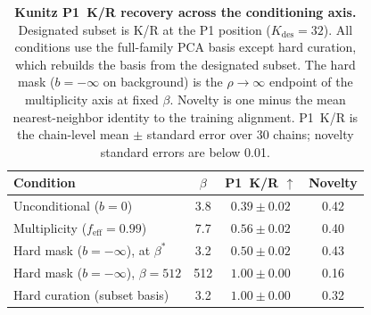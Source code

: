 \documentclass{article}
\theoremstyle{definition}
\theoremstyle{remark}
\begin{document}
\begin{table}[t]
  \centering
  \caption{\textbf{Kunitz P1~K/R recovery across the conditioning axis.} Designated
  subset is K/R at the P1 position ($K_{\mathrm{des}} = 32$). All conditions use the
  full-family PCA basis except hard curation, which rebuilds the basis from the
  designated subset. The hard mask ($b = -\infty$ on background) is the
  $\rho \to \infty$ endpoint of the multiplicity axis at fixed $\beta$. Novelty is one
  minus the mean nearest-neighbor identity to the training alignment. P1~K/R is the chain-level
  mean $\pm$ standard error over 30 chains; novelty standard errors are below 0.01.}
  \label{tab:mask-recovery}
  \begin{tabular}{@{}lccc@{}}
    \toprule
    Condition & $\beta$ & P1~K/R $\uparrow$ & Novelty \\
    \midrule
    Unconditional ($b = 0$)                      & 3.8 & $0.39 \pm 0.02$ & 0.42 \\
    Multiplicity ($f_{\mathrm{eff}}=0.99$)       & 7.7 & $0.56 \pm 0.02$ & 0.40 \\
    Hard mask ($b = -\infty$), at $\beta^{*}$    & 3.2 & $0.50 \pm 0.02$ & 0.43 \\
    Hard mask ($b = -\infty$), $\beta = 512$     & 512 & $1.00 \pm 0.00$ & 0.16 \\
    Hard curation (subset basis)                 & 3.2 & $1.00 \pm 0.00$ & 0.32 \\
    \bottomrule
  \end{tabular}
\end{table}
\end{document}
